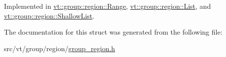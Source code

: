 Implemented in \hyperlink{structvt_1_1group_1_1region_1_1_range_a409f171c688707fa71e4aea1099ce691}{vt\+::group\+::region\+::\+Range}, \hyperlink{structvt_1_1group_1_1region_1_1_list_aaa38a1cc3062ed93fd6d6fbe2c65f1cf}{vt\+::group\+::region\+::\+List}, and \hyperlink{structvt_1_1group_1_1region_1_1_shallow_list_a358a60631cc0d1dd55d72af82e287014}{vt\+::group\+::region\+::\+Shallow\+List}.



The documentation for this struct was generated from the following file\+:\begin{DoxyCompactItemize}
\item 
src/vt/group/region/\hyperlink{group__region_8h}{group\+\_\+region.\+h}\end{DoxyCompactItemize}

